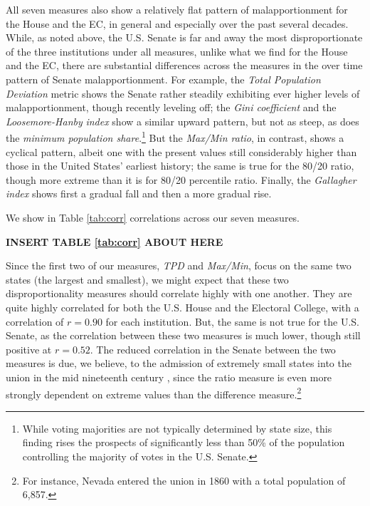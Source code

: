 All seven measures also show a relatively flat pattern of malapportionment for the House and the EC, in general and especially over the past several decades. While, as noted above, the U.S. Senate is far and away the most disproportionate of the three institutions under all measures, unlike what we find for the House and the EC, there are substantial differences across the measures in the over time pattern of Senate malapportionment. For example, the \textit{Total Population Deviation} metric shows the Senate rather steadily exhibiting ever higher levels of malapportionment, though recently leveling off; the \textit{Gini coefficient} and the \textit{Loosemore-Hanby} \textit{index} show a similar upward pattern, but not as steep, as does the \textit{minimum population share}.\footnote{While voting majorities are not typically determined by state size, this finding rises the prospects of significantly less than 50\% of the population controlling the majority of votes in the U.S. Senate.} But the \textit{Max/Min ratio}, in contrast, shows a cyclical pattern, albeit one with the present values still considerably higher than those in the United States' earliest history; the same is true for the 80/20 ratio, though more extreme than it is for 80/20 percentile ratio. Finally, the \textit{Gallagher index} shows first a gradual fall and then a more gradual rise.
 
 We show in Table \ref{tab:corr} correlations across our seven measures. 


 \begin{center}\textbf{INSERT TABLE \ref{tab:corr} ABOUT HERE} \end{center}

 Since the first two of our measures, \textit{TPD} and \textit{Max/Min}, focus on the same two states (the largest and smallest), we might expect that these two disproportionality measures should correlate highly with one another. They are quite highly correlated for both the U.S. House and the Electoral College, with a correlation of $r=0.90$ for each institution. But, the same is not true for the U.S. Senate, as the correlation between these two measures is much lower, though still positive at $r=0.52$. The reduced correlation in the Senate between the two measures is due, we believe, to the admission of extremely small states into the union in the mid nineteenth century \citep{Stewart_Weingast1992, Engstrom2013}, since the ratio measure is even more strongly dependent on extreme values than the difference measure.\footnote{For instance, Nevada entered the union in 1860 with a total population of 6,857.}

